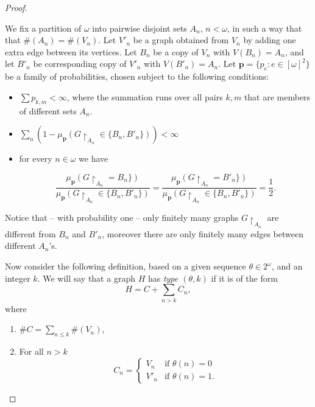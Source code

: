 \documentclass{amsart}
\theoremstyle{plain}
\theoremstyle{definition}
\theoremstyle{remark}
\numberwithin{equation}{section}
\begin{document}
\begin{proof}
\begin{center}
\begin{minipage}{0.45\textwidth}
\end{minipage}
\end{center}



    We fix a partition of $\omega$ into pairwise disjoint sets $A_n$, $n<\omega$, in such a way that that $\#(A_n)=\#(V_n)$. Let $V'_n$ be a graph obtained from $V_n$ by adding one extra edge between its vertices. Let $B_n$ be a copy of $V_n$ with $V(B_n)=A_n$, and let $B'_n$ be corresponding copy of $V'_n$ with $V(B'_n)=A_n$. Let $\textbf{p}=\{p_e : e \in [\omega]^2\}$ be a family of probabilities, chosen subject to the following conditions:
    \begin{itemize}
        \item $\sum p_{k,m} < \infty$, where the summation runs over all pairs $k,m$ that are members of different sets $A_n$. 
        \item $\sum\limits_n (1-\mu_{\textbf{p}}(G\upharpoonright_{A_n} \in \{B_n,B'_n\}))<\infty$
        \item for every $n\in \omega$ we have
        
        $$\frac{\mu_{\textbf{p}}(G\upharpoonright_{A_n} =B_n\})}{\mu_{\textbf{p}}(G\upharpoonright_{A_n} \in \{B_n,B'_n\})}=\frac{\mu_{\textbf{p}}(G\upharpoonright_{A_n} =B'_n\})}{\mu_{\textbf{p}}(G\upharpoonright_{A_n} \in \{B_n,B'_n\})}=\frac12.$$
        
    \end{itemize}
    Notice that -- with probability one -- only finitely many graphs $G\upharpoonright_{A_n}$ are different from $B_n$ and $B'_n$, moreover there are only finitely many edges between different $A_n$'s.

    Now consider the following definition, based on a given  sequence $\theta \in 2^\omega$, and an integer $k$. We will say that a graph $H$ has \emph{type $(\theta,k)$} if it is of the form
    $$H=C+\sum\limits_{n> k}C_n,$$
    where
    \begin{enumerate}
        \item $\#C=\sum\limits_{n\leq k}\#(V_n)$,
        \item For all $n>k$ 
\[
C_n= 
\begin{cases}
V_n & \text{if } \theta(n)=0 \\
V'_n & \text{if } \theta(n)=1.
\end{cases}
\]
    \end{enumerate}
    

\end{proof}
\end{document}
